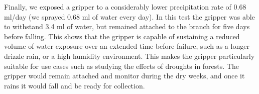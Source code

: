 Finally, we exposed a gripper to a considerably lower precipitation rate of 0.68 ml/day (we sprayed 0.68 ml of water every day). In this test the 
gripper was able to withstand 3.4 ml of water, but remained attached to the branch for five days before falling. This shows that the gripper is capable of sustaining a reduced volume of water exposure over an extended time before failure, such as a longer drizzle rain, or a high humidity environment. This makes the gripper particularly suitable for use cases such as studying the effects of droughts in forests. The gripper would remain attached and monitor during the dry weeks, and once it rains it would fall and be ready for collection.
%
%
%
